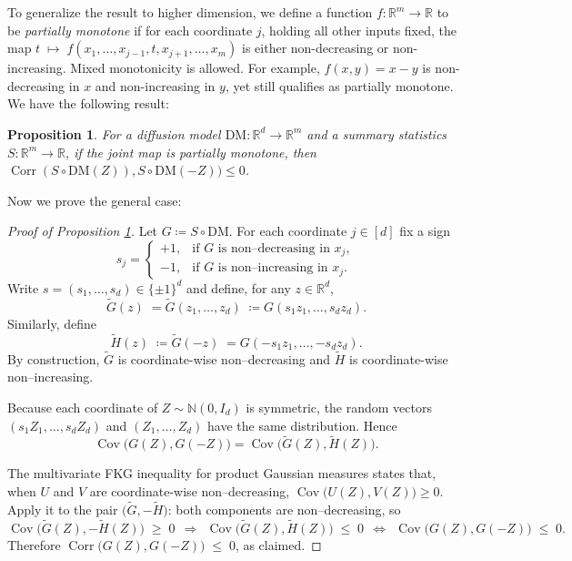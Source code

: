 \documentclass[12pt]{article}
\newcommand{\0}{\mathbf{0}}
\newcommand{\bN}{\mathbb{N}}
\newcommand{\DM}{\text{DM}}
\DeclareMathOperator{\Cov}{Cov}
\DeclareMathOperator{\Corr}{Corr}
\newtheorem{prop}{Proposition}
\begin{document}
To generalize the result to higher dimension, we define a function $f:\mathbb R^m\to\mathbb R$ to be \textit{partially monotone} if for each coordinate $j$, holding all other inputs fixed, the map $
t\;\mapsto\;f(x_1,\dots,x_{j-1},t,x_{j+1},\dots,x_m)$
is either non-decreasing or non-increasing. Mixed monotonicity is allowed. For example, $ f(x,y)=x - y $ is non-decreasing in $x$ and non-increasing in $y$, yet still qualifies as partially monotone. We have the following result:
\begin{prop}\label{prop:partially monotone}
    For a diffusion model $\DM: \mathbb R^d \rightarrow \mathbb R^m$ and a summary statistics $S: \mathbb R^m \rightarrow \mathbb R$, if the joint map is partially monotone, then $\Corr(S\circ\DM(Z)), S\circ\DM(-Z)) \leq  0$. 
\end{prop}



Now we prove the general case: 

\begin{proof}[Proof of Proposition \ref{prop:partially monotone}]\label{proof:fkg}
Let $G \coloneq S\circ \DM$.
For each coordinate $j\in[d]$ fix a sign
\[
s_j=\begin{cases}
+1,&\text{if }G\text{ is non--decreasing in }x_j,\\
-1,&\text{if }G\text{ is non--increasing in }x_j.
\end{cases}
\]
Write $s=(s_1,\dots,s_d)\in\{\pm1\}^{d}$ and define, for any $z\in\mathbb R^{d}$,
\[
\widetilde G(z)\;= \widetilde G(z_1, \ldots, z_d)\; \coloneq G(s_1z_1, \ldots, s_dz_d). \]
Similarly, define
\[
\widetilde H(z)\;\coloneq \widetilde G(-z)\; = G(-s_1z_1, \ldots, -s_dz_d).
\]
By construction,
$\widetilde G$ is coordinate-wise non–decreasing
and $\widetilde H$ is coordinate-wise non–increasing.



Because each coordinate of $Z\sim \bN(0,I_d)$ is symmetric, the random vectors
$(s_1Z_1, \ldots, s_dZ_d)$ and $(Z_1, \ldots, Z_d)$ have the same distribution.
Hence
\[
\Cov\bigl(G(Z),G(-Z)\bigr)
=
\Cov\bigl(\widetilde G(Z),\widetilde H(Z)\bigr).
\]


The multivariate FKG inequality \citep{fortuin1971correlation} for product Gaussian measures states that, when $U$ and $V$ are coordinate-wise non–decreasing,
$\Cov\bigl(U(Z),V(Z)\bigr)\ge0$.
Apply it to the pair $\bigl(\widetilde G,-\widetilde H\bigr)$:
both components are non–decreasing, so
\[
\Cov\!\bigl(\widetilde G(Z),-\widetilde H(Z)\bigr)\;\ge\;0
~~\Longrightarrow~~
\Cov\!\bigl(\widetilde G(Z),\widetilde H(Z)\bigr)\;\le\;0 ~~\Leftrightarrow~~ \Cov\!\bigl(G(Z),G(-Z)\bigr)\;\le\;0.
\]
Therefore $\Corr\bigl(G(Z),G(-Z)\bigr)\;\le\;0$, as claimed.
\end{proof}
\end{document}
